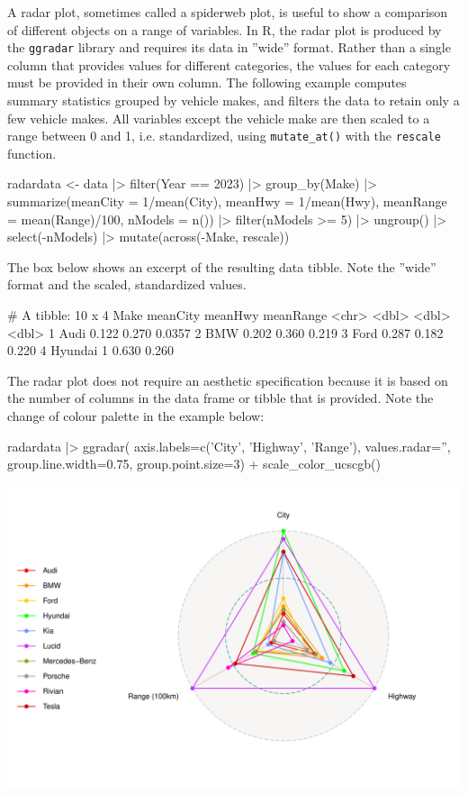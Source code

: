 A radar plot, sometimes called a spiderweb plot, is useful to show a comparison of different objects on a range of variables. In R, the radar plot is produced by the \texttt{ggradar} library and requires its data in ''wide'' format. Rather than a single column that provides values for different categories, the values for each category must be provided in their own column. The following example computes summary statistics grouped by vehicle makes, and filters the data to retain only a few vehicle makes. All variables except the vehicle make are then scaled to a range between 0 and 1, i.e. standardized, using \texttt{mutate\_at()} with the \texttt{rescale} function.

\begin{Rcode}
radardata <- data |>
  filter(Year == 2023) |> group_by(Make) |>
  summarize(meanCity = 1/mean(City), 
            meanHwy = 1/mean(Hwy), 
            meanRange = mean(Range)/100, 
            nModels = n()) |>
  filter(nModels >= 5) |> ungroup() |>
  select(-nModels) |>
  mutate(across(-Make, rescale))
\end{Rcode}

The box below shows an excerpt of the resulting data tibble. Note the ''wide'' format and the scaled, standardized values. 

\begin{textcode}
# A tibble: 10 x 4
   Make          meanCity meanHwy meanRange
   <chr>            <dbl>   <dbl>     <dbl>
 1 Audi            0.122    0.270    0.0357
 2 BMW             0.202    0.360    0.219 
 3 Ford            0.287    0.182    0.220 
 4 Hyundai         1        0.630    0.260 
\end{textcode}

The radar plot does not require an aesthetic specification because it is based on the number of columns in the data frame or tibble that is provided. Note the change of colour palette in the example below:

\begin{Rcode}
radardata |>  
  ggradar(
    axis.labels=c('City', 'Highway', 'Range'), 
    values.radar='', 
    group.line.width=0.75, 
    group.point.size=3) +
  scale_color_ucscgb()
\end{Rcode}


\begin{center}
  \includegraphics[width=.75\textwidth]{fuel.radar.pdf}
\end{center}

